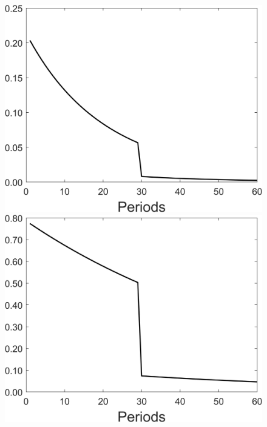 \begin{figure}[h!!]
\begin{minipage}[]{0.32\textwidth}
	\end{minipage}
	\begin{minipage}[]{0.32\textwidth}
		\includegraphics[width=1\textwidth]{../codding_model/Own/figures/Rep_agent/staticonlyRam_separate_hl_periods59_eppsilon0.40_zeta1.40_Ad08_Ac04_thetac0.70_thetad0.56_HetGrowth1_tauul0.181_util0_withtarget1_lgd0.png}
	\end{minipage}
	\begin{minipage}[]{0.32\textwidth}
		\includegraphics[width=1\textwidth]{../codding_model/Own/figures/Rep_agent/staticonlyRam_separate_yc_periods59_eppsilon0.40_zeta1.40_Ad08_Ac04_thetac0.70_thetad0.56_HetGrowth1_tauul0.181_util0_withtarget1_lgd0.png}

\end{minipage}
\end{figure}
